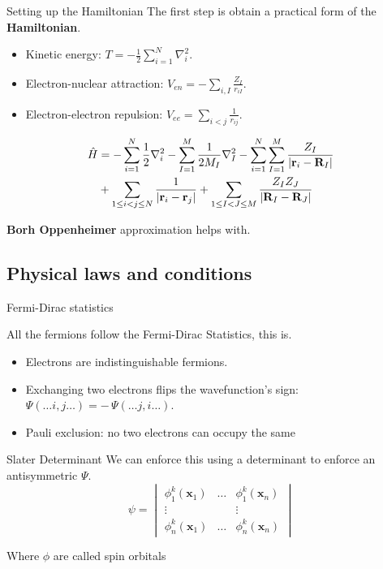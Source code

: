 \documentclass{beamer}
\begin{document}
\begin{frame}{Setting up the Hamiltonian}
  The first step is obtain a practical form of the \textbf{Hamiltonian}.

\begin{itemize}
        \item Kinetic energy: $T = -\frac{1}{2}\sum_{i=1}^{N} \nabla_i^2$.
        \item Electron-nuclear attraction: $V_{en} = -\sum_{i,I} \frac{Z_I}{r_{iI}}$.
        \item Electron-electron repulsion: $V_{ee} = \sum_{i<j} \frac{1}{r_{ij}}$.
    \end{itemize}
\begin{align}
   \hat H & =
-\sum_{i=1}^{N}\frac{1}{2}\nabla_i^{2}
-\sum_{I=1}^{M}\frac{1}{2M_I}\nabla_{I}^{2}
-\sum_{i=1}^{N}\sum_{I=1}^{M}\frac{Z_I}{|\mathbf r_i-\mathbf R_I|} \notag\\
& +\sum_{1\le i<j\le N}\frac{1}{|\mathbf r_i-\mathbf r_j|}
+\sum_{1\le I<J\le M}\frac{Z_I Z_J}{|\mathbf R_I-\mathbf R_J|}
\end{align}

\textbf{Borh Oppenheimer} approximation helps with.
\end{frame}

\subsection{Physical laws and conditions}


\begin{frame}{Fermi-Dirac statistics}

All the fermions follow the Fermi-Dirac Statistics, this is.

  \begin{itemize}
        \item Electrons are indistinguishable fermions.
        \item Exchanging two electrons flips the wavefunction's sign: $\Psi(\dots i,j \dots) = -\,\Psi(\dots j,i \dots)$.
        \item Pauli exclusion: no two electrons can occupy the same
    \end{itemize}

    \begin{block}{Slater Determinant}
We can enforce this using a determinant to enforce an antisymmetric $\Psi$.
\begin{equation}
\psi=
\begin{vmatrix}
\phi_{1}^{k}(\mathbf{x}_{1})  & \dots  &  \phi_{1}^{k}(\mathbf{x}_{n}) \\
\vdots   &  & \vdots  \\
\phi_{n}^{k}(\mathbf{x}_{1}) & \dots & \phi_{n}^{k}(\mathbf{x}_{n})
\end{vmatrix}
\end{equation}
\end{block}
Where $\phi$ are called spin orbitals
\end{frame}
\end{document}
